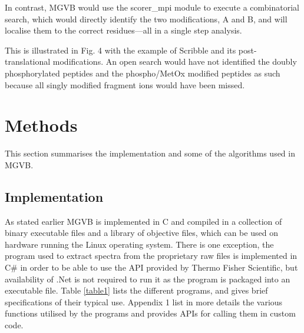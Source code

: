 \documentclass[sn-standardnature]{sn-jnl}%
\theoremstyle{thmstyleone}%
\theoremstyle{thmstyletwo}%
\theoremstyle{thmstylethree}%
\begin{document}
In contrast, MGVB would use the scorer\_mpi module to execute a combinatorial search, which would directly identify the two modifications, A and B, and will localise them to the correct residues—all in a single step analysis. 

This is illustrated in Fig. 4 with the example of Scribble and its post-translational modifications.  An open search would have not identified the doubly phosphorylated peptides and the phospho/MetOx modified peptides as such because all singly modified fragment ions would have been missed.

\section{Methods}\label{sec3}

This section summarises the implementation and some of the algorithms used in MGVB. 

\subsection{Implementation}\label{subsec1}
As stated earlier MGVB is implemented in C and compiled in a collection of binary executable files and a library of objective files, which can be used on hardware running the Linux operating system. There is one exception, the program used to extract spectra from the proprietary raw files is implemented in C\# in order to be able to use the API provided by Thermo Fisher Scientific, but availability of .Net is not required to run it as the program is packaged into an executable file. Table \ref{table1} lists the different programs, and gives brief specifications of their typical use. Appendix 1 list in more details the various functions utilised by the programs and provides APIs for calling them in custom code. 
\end{document}
